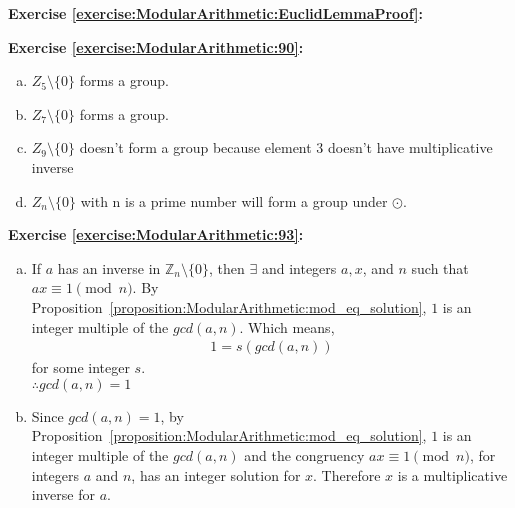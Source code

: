 \noindent\textbf{Exercise \ref{exercise:ModularArithmetic:EuclidLemmaProof}:}

\noindent\textbf{Exercise \ref{exercise:ModularArithmetic:90}:} 
\begin{enumerate}[(a)]
\item
 $Z_5 \setminus \{0\}$ forms a group.
 
\item
$Z_7 \setminus \{0\}$ forms a group.

\item
$Z_9 \setminus \{0\}$ doesn't form a group because element 3 doesn't have multiplicative inverse

\item
$Z_n \setminus \{0\}$ with n is a prime number will form a group under $\odot$.
\end{enumerate}

\noindent\textbf{Exercise \ref{exercise:ModularArithmetic:93}:} %
\begin{enumerate}[(a)]
\item  
If $a$ has an inverse in ${\mathbb{Z}_n} \setminus\{0\}$, then $\exists$ and integers $a, x$, and $n$ such that $ax\equiv 1 \pmod{n}$. By Proposition~\ref{proposition:ModularArithmetic:mod_eq_solution}, $1$ is an integer multiple of the $gcd(a,n)$. Which means,
\begin{align*}
1 = s(gcd(a,n))
\end{align*}
for some integer $s$.\\
$\therefore gcd(a,n) = 1$

\item 
Since $gcd(a,n) = 1$, by Proposition~\ref{proposition:ModularArithmetic:mod_eq_solution}, $1$ is an integer multiple of the $gcd(a,n)$ and the congruency $ax\equiv 1 \pmod{n}$, for integers $a$ and $n$, has an integer solution for $x$. Therefore $x$ is a multiplicative inverse for $a$.
\end{enumerate}

